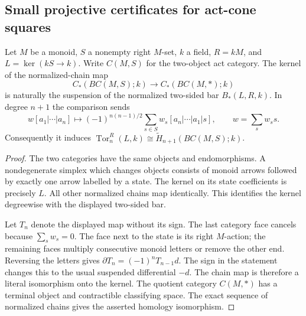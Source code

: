 \subsection{Small projective certificates for act-cone squares}

\begin{lemma}
\label{C:act-cone-literal-bar-kernel}
Let $M$ be a monoid, $S$ a nonempty right $M$-set, $k$ a field,
$R=kM$, and $L=\ker(kS\to k)$.
Write $C(M,S)$ for the two-object act category.
The kernel of the normalized-chain map
\[
 C_*(BC(M,S);k)\longrightarrow C_*(BC(M,*);k)
\]
is naturally the suspension of the normalized two-sided bar
$B_*(L,R,k)$.  In degree $n+1$ the comparison sends
\[
 w[a_1|\cdots|a_n]\longmapsto
 (-1)^{n(n-1)/2}\sum_{s\in S}w_s
       [a_n|\cdots|a_1|s],\qquad w=\sum_s w_s s.
\]
Consequently it induces
$\operatorname{Tor}_n^R(L,k)\cong\widetilde H_{n+1}(BC(M,S);k)$.
\end{lemma}
\begin{proof}
The two categories have the same objects and endomorphisms.
A nondegenerate simplex which changes objects consists of monoid
arrows followed by exactly one arrow labelled by a state.
The kernel on its state coefficients is precisely $L$.
All other normalized chains map identically.  This identifies the
kernel degreewise with the displayed two-sided bar.

Let $T_n$ denote the displayed map without its sign.
The last category face cancels because $\sum_s w_s=0$.
The face next to the state is its right $M$-action; the remaining
faces multiply consecutive monoid letters or remove the other end.
Reversing the letters gives
$\partial T_n=(-1)^nT_{n-1}d$.
The sign in the statement changes this to the usual suspended
differential $-d$.  The chain map is therefore a literal isomorphism
onto the kernel.  The quotient category $C(M,*)$ has a terminal
object and contractible classifying space.  The exact sequence of
normalized chains gives the asserted homology isomorphism.
\end{proof}

